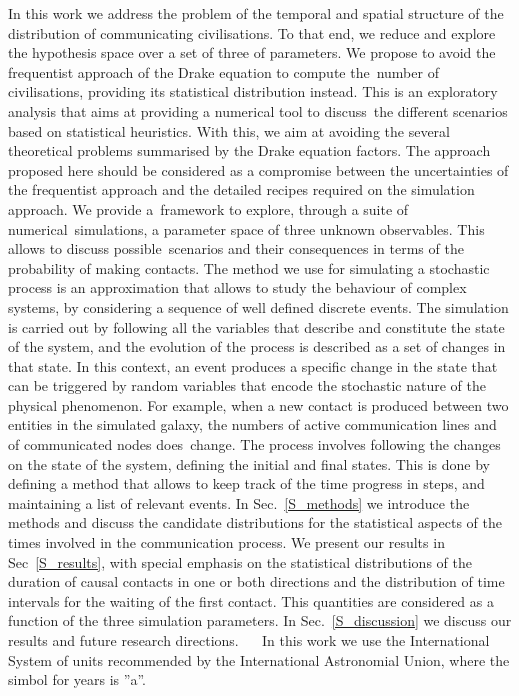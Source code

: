 \documentclass[crop]{CSLB}
\begin{document}
In this work we address the problem of the temporal and spatial
structure of the distribution of communicating civilisations.
%
To that end, we reduce and explore the hypothesis space over a set of
three of parameters.
%
We propose to avoid the frequentist approach of the Drake equation to
compute the number of civilisations, providing its statistical
distribution instead.
%
This is an exploratory analysis that aims at providing a numerical
tool to discuss the different scenarios based on statistical
heuristics.
%
With this, we aim at avoiding the several theoretical problems
summarised by the Drake equation factors.
%
The approach proposed here should be considered as a compromise
between the uncertainties of the frequentist approach and the detailed
recipes required on the simulation approach.
%
We provide a framework to explore, through a suite of
numerical simulations, a parameter space of three unknown observables.
%
This allows to discuss possible scenarios and their consequences in
terms of the probability of making contacts.
%
The method we use for simulating a stochastic process is an
approximation that allows to study the behaviour of complex systems,
by considering a sequence of well defined discrete events.
%
The simulation is carried out by following all the variables that
describe and constitute the state of the system, and the evolution of
the process is described as a set of changes in that state.
%
In this context, an event produces a specific change in the state that
can be triggered by random variables that encode the stochastic nature
of the physical phenomenon.
%
For example, when a new contact is produced between two entities in
the simulated galaxy, the numbers of active communication lines and of
communicated nodes does change.
%
The process involves following the changes on the state of the system,
defining the initial and final states.
%
This is done by defining a method that allows to keep track of the
time progress in steps, and maintaining a list of relevant events.
%
In Sec.~\ref{S_methods} we introduce the methods and discuss the
candidate distributions for the statistical aspects of the times
involved in the communication process.
%
We present our results in Sec~\ref{S_results}, with special emphasis
on the statistical distributions of the duration of causal contacts in
one or both directions and the distribution of time intervals for the
waiting of the first contact.
%
This quantities are considered as a function of the three simulation
parameters.
%
In Sec.~\ref{S_discussion} we discuss our results and future research
directions.   
%
In this work we use the International System of units recommended by
the International Astronomial Union, where the simbol for years is
''a''.
\end{document}
